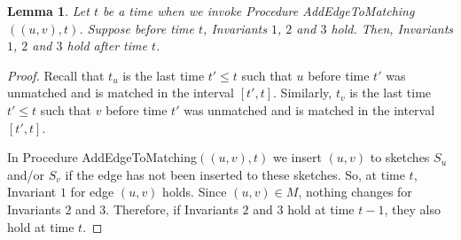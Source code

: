 \documentclass[11pt,letter]{article}
\newtheorem{lemma}[theorem]{Lemma}
\begin{document}
\begin{center}
\end{center}



\begin{center}
\end{center}




\begin{lemma}
 \label{lem:timestamps:case:1}
Let $t$ be a time when we invoke Procedure {\sf AddEdgeToMatching$((u,v), t)$}.
Suppose before time $t$, Invariants $1$, $2$ and $3$ hold.
Then, Invariants $1$, $2$ and $3$ hold after time $t$.
\end{lemma}

\begin{proof}
Recall that $t_u$ is the last time $t'\le t$ such that $u$ before time $t'$ was
unmatched and is matched in the interval $[t',t]$.
Similarly, $t_v$ is the last time $t'\le t$ such that $v$ before time $t'$ was
unmatched and is matched in the interval $[t',t]$.

In Procedure {\sf AddEdgeToMatching$((u,v), t)$} we insert $(u,v)$ to sketches
$S_u$ and/or $S_v$ if the edge has not been inserted to these sketches.
So, at time $t$, Invariant $1$ for edge $(u,v)$ holds.
Since $(u,v)\in M$, nothing changes for Invariants $2$ and $3$.
Therefore, if Invariants $2$ and $3$ hold at time $t-1$,
they also hold at time $t$.
\end{proof}
\end{document}
